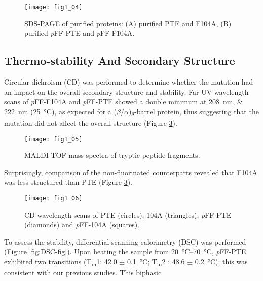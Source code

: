\begin{refsection}
\begin{figure}[h!] \centering \texttt{[image: fig1\_04]}
    \caption[SDS-PAGE of purified proteins: (A) purified PTE and F104A, (B)
    purified \emph{p}FF-PTE and \emph{p}FF-F104A.]{SDS-PAGE of purified
        proteins: (A) purified PTE and F104A, (B) purified \emph{p}FF-PTE and
        \emph{p}FF-F104A.} \label{fig:sds-gel} 
\end{figure}

\subsection{Thermo-stability And Secondary Structure}

Circular dichroism (CD) was performed to determine whether the mutation had an
impact on the overall secondary structure and stability. Far-UV wavelength
scans of \emph{p}FF-F104A and \emph{p}FF-PTE showed a double minimum at
\SIlist{208;222}{\nm} (\SI{25}{\celsius}), as expected for a
($\beta$/$\alpha$)\textsubscript{8}-barrel protein, thus suggesting that the
mutation did not affect the overall structure (Figure \ref{fig:CD-fig}).  
\begin{figure}[h!] \centering \texttt{[image: fig1\_05]}
    \caption[MALDI-TOF mass spectra of tryptic peptide fragments.]{MALDI-TOF
    mass spectra of tryptic peptide fragments.} \label{fig:MALDI-fig} 
\end{figure}
Surprisingly, comparison of the non-fluorinated counterparts revealed that
F104A was less structured than PTE (Figure \ref{fig:CD-fig}). 
\begin{figure}[h!] \centering \texttt{[image: fig1\_06]}
    \caption[CD wavelength scans of PTE (circles), 104A (triangles),
    \emph{p}FF-PTE (diamonds) and \emph{p}FF-104A (squares).]{CD wavelength
        scans of PTE (circles), 104A (triangles), \emph{p}FF-PTE (diamonds) and
        \emph{p}FF-104A (squares).} \label{fig:CD-fig} 
\end{figure}
To assess the stability, differential scanning calorimetry (DSC) was performed
(Figure \ref{fig:DSC-fig}). Upon heating the sample from \SIrange{20}{70}{\celsius},
\emph{p}FF-PTE exhibited two transitions (T\textsubscript{m}1: 42.0 $\pm$
\SI{0.1}{\celsius}; T\textsubscript{m}2 : 48.6 $\pm$ \SI{0.2}{\celsius}); this
was consistent with our previous studies\cite{Baker2011b}. This biphasic

\end{refsection}
